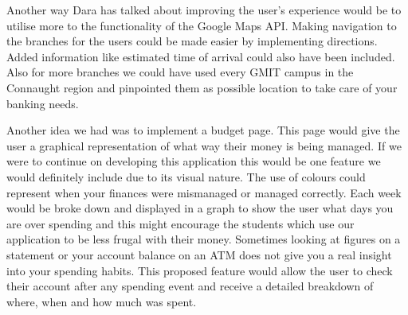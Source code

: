 Another way Dara has talked about improving the user’s experience would be to utilise more to the functionality of the Google Maps API. Making navigation to the branches for the users could be made easier by implementing directions. Added information like estimated time of arrival could also have been included. Also for more branches we could have used every GMIT campus in the Connaught region and pinpointed them as possible location to take care of your banking needs.

Another idea we had was to implement a budget page. This page would give the user a graphical representation of what way their money is being managed. If we were to continue on developing this application this would be one feature we would definitely include due to its visual nature. The use of colours could represent when your finances were mismanaged or managed correctly. Each week would be broke down and displayed in a graph to show the user what days you are over spending and this might encourage the students which use our application to be less frugal with their money. Sometimes looking at figures on a statement or your account balance on an ATM does not give you a real insight into your spending habits. This proposed feature would allow the user to check their account after any spending event and receive a detailed breakdown of where, when and how much was spent.      




